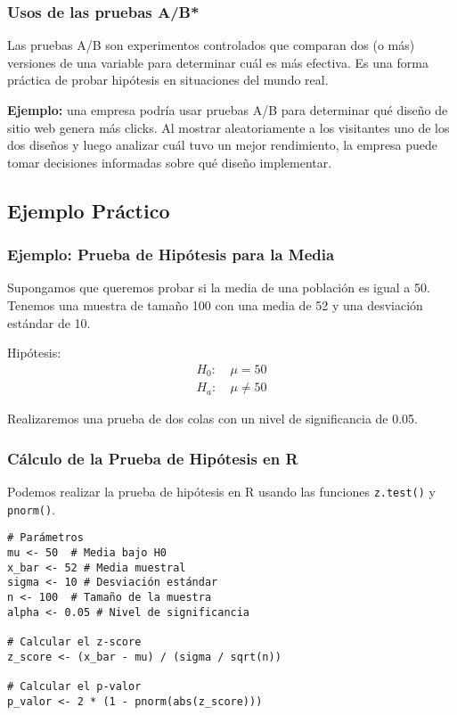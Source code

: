 \documentclass[aspectratio=169]{beamer}
\begin{document}
\begin{frame}
\frametitle{Usos de las pruebas A/B*}
Las pruebas A/B son experimentos controlados que comparan dos (o más) versiones de una variable para determinar cuál es más efectiva. Es una forma práctica de probar hipótesis en situaciones del mundo real.

\vfill

{\bf Ejemplo:} una empresa podría usar pruebas A/B para determinar qué diseño de sitio web genera más clicks. Al mostrar aleatoriamente a los visitantes uno de los dos diseños y luego analizar cuál tuvo un mejor rendimiento, la empresa puede tomar decisiones informadas sobre qué diseño implementar.
\end{frame}





\subsection{Ejemplo Práctico}
\begin{frame}
\frametitle{Ejemplo: Prueba de Hipótesis para la Media}
Supongamos que queremos probar si la media de una población es igual a 50. Tenemos una muestra de tamaño 100 con una media de 52 y una desviación estándar de 10.

Hipótesis:
\[
\begin{align*}
H_0: & \ \mu = 50 \\
H_a: & \ \mu \neq 50
\end{align*}
\]

Realizaremos una prueba de dos colas con un nivel de significancia de 0.05.
\end{frame}

\begin{frame}[fragile]
\frametitle{Cálculo de la Prueba de Hipótesis en R}
Podemos realizar la prueba de hipótesis en R usando las funciones \texttt{z.test()} y \texttt{pnorm()}.

\begin{verbatim}
# Parámetros
mu <- 50  # Media bajo H0
x_bar <- 52 # Media muestral
sigma <- 10 # Desviación estándar
n <- 100  # Tamaño de la muestra
alpha <- 0.05 # Nivel de significancia

# Calcular el z-score
z_score <- (x_bar - mu) / (sigma / sqrt(n))

# Calcular el p-valor
p_valor <- 2 * (1 - pnorm(abs(z_score)))

\end{verbatim}

\end{frame}
\end{document}
